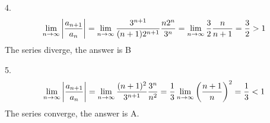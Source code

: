\documentclass{article}
\numberwithin{equation}{section}
\begin{document}
4.
\[
\lim_{n\to\infty} \abs{\frac{a_{n+1}}{a_n}} = \lim_{n\to\infty} \frac{3^{n+1}}{(n+1)2^{n+1}} \frac{n2^n}{3^n} = \lim_{n\to\infty} \frac{3}{2} \frac{n}{n+1} = \frac{3}{2} > 1
\]
The series diverge, the answer is B

5.
\[
\lim_{n\to\infty} \abs{\frac{a_{n+1}}{a_n}} = \lim_{n\to\infty} \frac{(n+1)^2}{3^{n+1}} \frac{3^n}{n^2} = \frac{1}{3}\lim_{n\to\infty} \left(\frac{n+1}{n}\right)^2 = \frac{1}{3} < 1
\]
The series converge, the answer is A.
\end{document}
